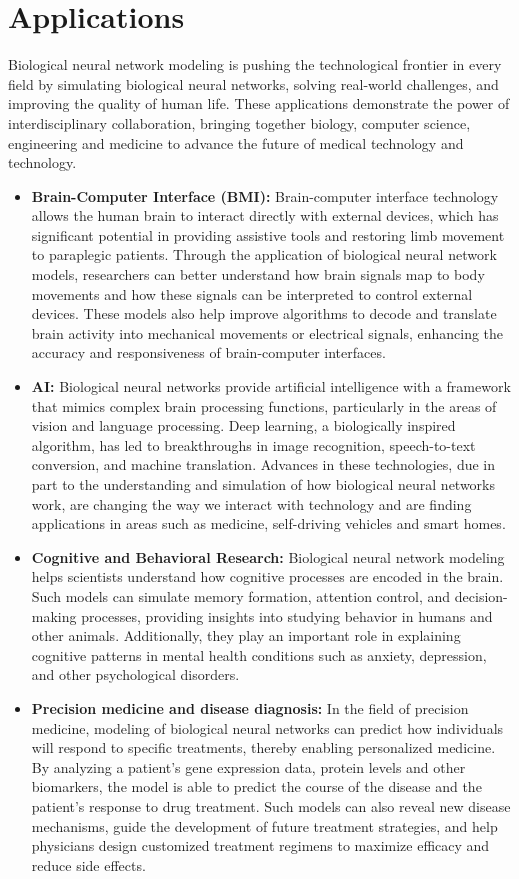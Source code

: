 \documentclass[paper=a4, fontsize=11pt]{scrartcl} %
\numberwithin{equation}{section} %
\numberwithin{figure}{section} %
\numberwithin{table}{section} %
\begin{document}
\section{Applications}
Biological neural network modeling is pushing the technological frontier in every field by simulating biological neural networks, solving real-world challenges, and improving the quality of human life. These applications demonstrate the power of interdisciplinary collaboration, bringing together biology, computer science, engineering and medicine to advance the future of medical technology and technology.

\begin{itemize}
    \item \textbf{ Brain-Computer Interface (BMI):} Brain-computer interface technology allows the human brain to interact directly with external devices, which has significant potential in providing assistive tools and restoring limb movement to paraplegic patients. Through the application of biological neural network models, researchers can better understand how brain signals map to body movements and how these signals can be interpreted to control external devices. These models also help improve algorithms to decode and translate brain activity into mechanical movements or electrical signals, enhancing the accuracy and responsiveness of brain-computer interfaces.
    \item \textbf{AI:} Biological neural networks provide artificial intelligence with a framework that mimics complex brain processing functions, particularly in the areas of vision and language processing. Deep learning, a biologically inspired algorithm, has led to breakthroughs in image recognition, speech-to-text conversion, and machine translation. Advances in these technologies, due in part to the understanding and simulation of how biological neural networks work, are changing the way we interact with technology and are finding applications in areas such as medicine, self-driving vehicles and smart homes.
    \item \textbf{Cognitive and Behavioral Research:} Biological neural network modeling helps scientists understand how cognitive processes are encoded in the brain. Such models can simulate memory formation, attention control, and decision-making processes, providing insights into studying behavior in humans and other animals. Additionally, they play an important role in explaining cognitive patterns in mental health conditions such as anxiety, depression, and other psychological disorders.
    \item \textbf{Precision medicine and disease diagnosis:} In the field of precision medicine, modeling of biological neural networks can predict how individuals will respond to specific treatments, thereby enabling personalized medicine. By analyzing a patient's gene expression data, protein levels and other biomarkers, the model is able to predict the course of the disease and the patient's response to drug treatment. Such models can also reveal new disease mechanisms, guide the development of future treatment strategies, and help physicians design customized treatment regimens to maximize efficacy and reduce side effects.
\end{itemize}
\end{document}
